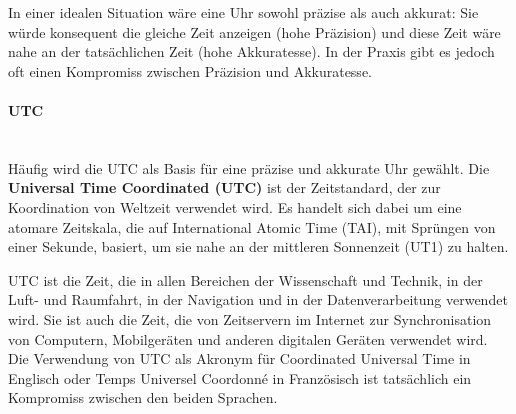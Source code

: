 \documentclass[../vs-script-first-v01.tex]{subfiles}
\begin{document}
In einer idealen Situation wäre eine Uhr sowohl präzise als auch akkurat: Sie würde konsequent die gleiche Zeit anzeigen (hohe Präzision) und diese Zeit wäre nahe an der tatsächlichen Zeit (hohe Akkuratesse). In der Praxis gibt es jedoch oft einen Kompromiss zwischen Präzision und Akkuratesse.
\paragraph{UTC}\mbox{}\\
Häufig wird die UTC als Basis für eine präzise und akkurate Uhr gewählt.
Die \textbf{Universal Time Coordinated (UTC)} ist der Zeitstandard, der zur Koordination von Weltzeit verwendet wird. Es handelt sich dabei um eine atomare Zeitskala, die auf International Atomic Time (TAI), mit Sprüngen von einer Sekunde, basiert, um sie nahe an der mittleren Sonnenzeit (UT1) zu halten.

UTC ist die Zeit, die in allen Bereichen der Wissenschaft und Technik, in der Luft- und Raumfahrt, in der Navigation und in der Datenverarbeitung verwendet wird. Sie ist auch die Zeit, die von Zeitservern im Internet zur Synchronisation von Computern, Mobilgeräten und anderen digitalen Geräten verwendet wird.
Die Verwendung von UTC als Akronym für Coordinated Universal Time in Englisch oder Temps Universel Coordonné in Französisch ist tatsächlich ein Kompromiss zwischen den beiden Sprachen.
\end{document}
